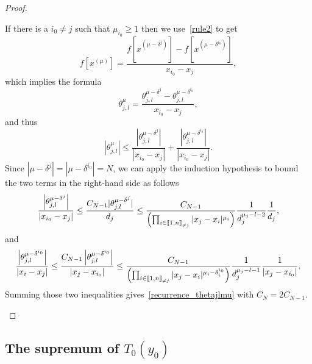 \documentclass[AHL,Unicode,longabstracts]{cedram}
\newcommand{\llbracket}{\mathopen{[\mkern -2.7mu[}}
\newcommand{\rrbracket}{\mathclose{]\mkern -2.7mu]}}
\newcommand{\interexclu}[3]{\llbracket #1,#2\rrbracket_{\neq #3}}
\begin{document}
\begin{proof}
\begin{itemize}
\begin{itemize}
If there is a $i_0\neq j$ such that $\mu_{i_0}\geq 1$ then we use~\eqref{rule2} to get
\[
f\left[x^{(\mu)}\right] = \frac{f\left[x^{(\mu-\delta^j)}\right] - f\left[x^{(\mu-\delta^{i_0})}\right]}{x_{i_0}-x_j},
\]
which implies the formula
\[
\theta_{j,l}^{\mu} = \frac{\theta_{j,l}^{\mu-\delta^j} - \theta_{j,l}^{\mu-\delta^{i_0}}}{x_{i_0}-x_j},
\]
and thus
\[
\left|\theta_{j,l}^{\mu}\right|\leq \frac{\left|\theta_{j,l}^{\mu-\delta^j}\right|}{\left|x_{i_0}-x_j\right|} + \frac{\left|\theta_{j,l}^{\mu-\delta^{i_0}}\right|}{\left|x_{i_0}-x_j\right|}.
\]
Since $|\mu-\delta^j|=|\mu-\delta^{i_0}|=N$, we can apply the induction hypothesis to bound the two terms in the right-hand side as follows
\begin{equation*}
\frac{\left|\theta_{j,l}^{\mu-\delta^j}\right|}{\left|x_{i_0}-x_j\right|} \leq \frac{C_{N-1} |\theta_{j,l}^{\mu-\delta^j}|}{d_j} \leq \frac{C_{N-1}}{\left(\prod_{i\in\interexclu{1}{n}{j}} |x_j-x_i|^{\mu_i}\right)} \frac{1}{d_j^{\mu_j-l-2}} \frac{1}{d_j},
\end{equation*}
and
\begin{equation*}
\frac{\left|\theta_{j,l}^{\mu-\delta^{i_0}}\right|}{\left|x_i-x_j\right|} \leq \frac{C_{N-1} \left|\theta_{j,l}^{\mu-\delta^{i_0}}\right|}{\left|x_j-x_{i_0}\right|}
\leq \frac{C_{N-1}}{\left(\prod_{i\in\interexclu{1}{n}{j}} |x_j-x_i|^{\mu_i-\delta_i^{i_0}}\right)} \frac{1}{d_j^{\mu_j-l-1}} \frac{1}{|x_j-x_{i_0}|}.
\end{equation*}
Summing those two inequalities gives~\eqref{recurrence_thetajlmu} with $C_N=2C_{N-1}$.\qedhere
\end{itemize}
\end{itemize}
\end{proof}



\subsection{The supremum of \texorpdfstring{$T_0(y_0)$}{T0(F0)}} \label{Subsec:Sup_Tmin}
\end{document}
